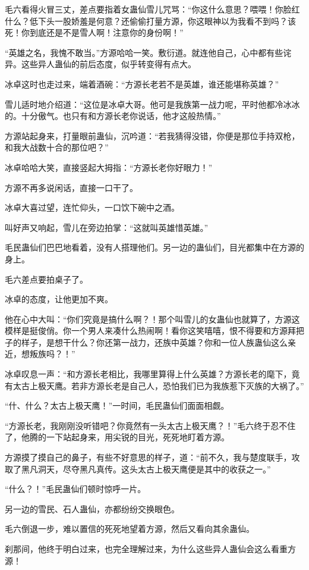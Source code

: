 \begin{this_body}
毛六看得火冒三丈，差点要指着女蛊仙雪儿咒骂：“你这什么意思？喂喂！你脸红什么？低下头一股娇羞是何意？还偷偷打量方源，你这眼神以为我看不到吗？该死！你到底还是不是雪人啊！注意你的身份啊！”

“英雄之名，我愧不敢当。”方源哈哈一笑。敷衍道。就连他自己，心中都有些诧异。这些异人蛊仙的前后态度，似乎转变得有点大。

冰卓这时也走过来，端着酒碗：“方源长老若不是英雄，谁还能堪称英雄？”

雪儿适时地介绍道：“这位是冰卓大哥。他可是我族第一战力呢，平时他都冷冰冰的。十分傲气。也只有和方源长老你说话，他才这般热情。”

方源站起身来，打量眼前蛊仙，沉吟道：“若我猜得没错，你便是那位手持双枪，和我大战数十合的那位吧？”

冰卓哈哈大笑，直接竖起大拇指：“方源长老你好眼力！”

方源不再多说闲话，直接一口干了。

冰卓大喜过望，连忙仰头，一口饮下碗中之酒。

叫好声又响起，雪儿在旁边拍掌：“这就叫英雄惜英雄。”

毛民蛊仙们巴巴地看着，没有人搭理他们。另一边的蛊仙们，目光都集中在方源的身上。

毛六差点要拍桌子了。

冰卓的态度，让他更加不爽。

他在心中大叫：“你们究竟是搞什么啊？！那个叫雪儿的女蛊仙也就算了，方源这模样是挺俊俏。你一个男人来凑什么热闹啊！看你这笑嘻嘻，恨不得要和方源拜把子的样子，是想干什么？你还第一战力，还族中英雄？你和一位人族蛊仙这么亲近，想叛族吗？！”

冰卓叹息一声：“和方源长老相比，我哪里算得上什么英雄？方源长老的麾下，竟有太古上极天鹰。若非方源长老是自己人，恐怕我们已为我族惹下灭族的大祸了。”

“什、什么？太古上极天鹰！”一时间，毛民蛊仙们面面相觑。

“方源长老，我刚刚没听错吧？你竟然有一头太古上极天鹰？！”毛六终于忍不住了，他腾的一下站起身来，用尖锐的目光，死死地盯着方源。

方源摸了摸自己的鼻子，有些不好意思的样子，道：“前不久，我与楚度联手，攻取了黑凡洞天，尽夺黑凡真传。这头太古上极天鹰便是其中的收获之一。”

“什么？！”毛民蛊仙们顿时惊呼一片。

另一边的雪民、石人蛊仙，亦都纷纷交换眼色。

毛六倒退一步，难以置信的死死地望着方源，然后又看向其余蛊仙。

刹那间，他终于明白过来，也完全理解过来，为什么这些异人蛊仙会这么看重方源！


\end{this_body}
